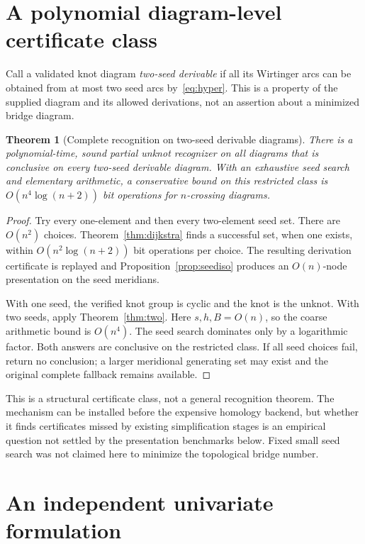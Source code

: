 \documentclass[11pt]{article}
\newtheorem{theorem}{Theorem}[section]
\theoremstyle{definition}
\theoremstyle{remark}
\begin{document}
\section{A polynomial diagram-level certificate class}
\label{sec:twoseed}

Call a validated knot diagram \emph{two-seed derivable} if all its Wirtinger arcs can be obtained from at most two seed arcs by~\eqref{eq:hyper}. This is a property of the supplied diagram and its allowed derivations, not an assertion about a minimized bridge diagram.

\begin{theorem}[Complete recognition on two-seed derivable diagrams]
\label{thm:twoseed}
There is a polynomial-time, sound partial unknot recognizer on all diagrams that is conclusive on every two-seed derivable diagram. With an exhaustive seed search and elementary arithmetic, a conservative bound on this restricted class is $O(n^4\log(n+2))$ bit operations for $n$-crossing diagrams.
\end{theorem}
\begin{proof}
Try every one-element and then every two-element seed set. There are $O(n^2)$ choices. Theorem~\ref{thm:dijkstra} finds a successful set, when one exists, within $O(n^2\log(n+2))$ bit operations per choice. The resulting derivation certificate is replayed and Proposition~\ref{prop:seediso} produces an $O(n)$-node presentation on the seed meridians.

With one seed, the verified knot group is cyclic and the knot is the unknot. With two seeds, apply Theorem~\ref{thm:two}. Here $s,h,B=O(n)$, so the coarse arithmetic bound is $O(n^4)$. The seed search dominates only by a logarithmic factor. Both answers are conclusive on the restricted class. If all seed choices fail, return no conclusion; a larger meridional generating set may exist and the original complete fallback remains available.
\end{proof}

This is a structural certificate class, not a general recognition theorem. The mechanism can be installed before the expensive homology backend, but whether it finds certificates missed by existing simplification stages is an empirical question not settled by the presentation benchmarks below. Fixed small seed search was not claimed here to minimize the topological bridge number.

\section{An independent univariate formulation}
\label{sec:univariate}
\end{document}

